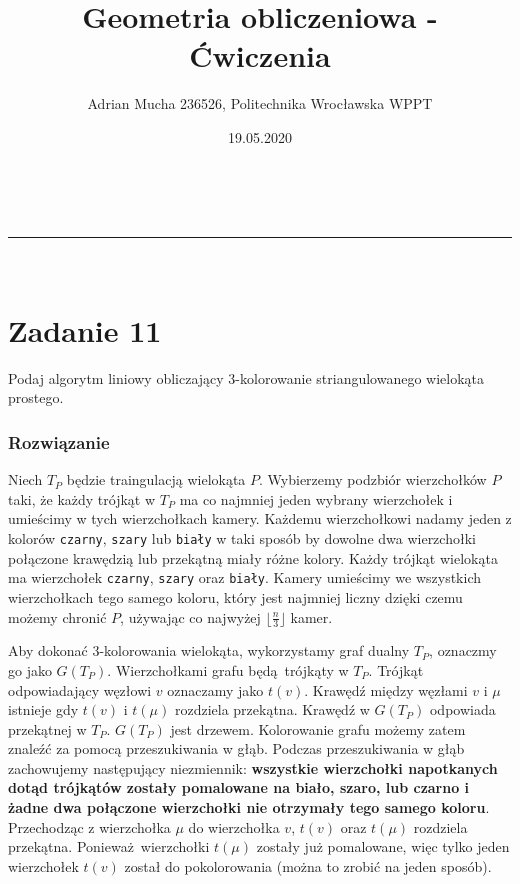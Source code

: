 \documentclass[a4paper,11pt]{article}
\makeatletter
\newcommand{\linia}{\rule{\linewidth}{0.5pt}}
\theoremstyle{mytheor}
\renewcommand{\maketitle}{
\begin{center}
\vspace{2ex}
{\huge \textsc{\@title}}
\vspace{1ex}
\\
\linia\\
\@author \hfill \@date
\vspace{4ex}
\end{center}
}
\makeatother
\begin{document}
\title{Geometria obliczeniowa - Ćwiczenia}

\author{Adrian Mucha 236526, Politechnika Wrocławska WPPT}

\date{19.05.2020}

\maketitle

\section*{Zadanie 11}
Podaj algorytm liniowy obliczający 3-kolorowanie striangulowanego wielokąta prostego.
\subsubsection*{Rozwiązanie}
Niech $T_P$ będzie traingulacją wielokąta $P$. Wybierzemy podzbiór wierzchołków $P$ taki, że każdy trójkąt w $T_P$ ma co najmniej jeden wybrany wierzchołek i umieścimy w tych wierzchołkach kamery. Każdemu wierzchołkowi nadamy jeden z kolorów \texttt{czarny}, \texttt{szary} lub \texttt{biały} w taki sposób by dowolne dwa wierzchołki połączone krawędzią lub przekątną miały różne kolory. Każdy trójkąt wielokąta ma wierzchołek \texttt{czarny}, \texttt{szary} oraz \texttt{biały}. Kamery umieścimy we wszystkich wierzchołkach tego samego koloru, który jest najmniej liczny dzięki czemu możemy chronić $P$, używając co najwyżej $\lfloor\frac{n}{3}\rfloor$ kamer.

Aby dokonać 3-kolorowania wielokąta, wykorzystamy graf dualny $T_P$, oznaczmy go jako $G(T_P)$. Wierzchołkami grafu będą trójkąty w $T_P$. Trójkąt odpowiadający węzłowi $v$ oznaczamy jako $t(v)$. Krawędź między węzłami $v$ i $\mu$ istnieje gdy $t(v)$ i $t(\mu)$ rozdziela przekątna. Krawędź w $G(T_P)$ odpowiada przekątnej w $T_P$. $G(T_P)$ jest drzewem. Kolorowanie grafu możemy zatem znaleźć za pomocą przeszukiwania w głąb. Podczas przeszukiwania w głąb zachowujemy następujący niezmiennik: \textbf{wszystkie wierzchołki napotkanych dotąd trójkątów zostały pomalowane na biało, szaro, lub czarno i żadne dwa połączone wierzchołki nie otrzymały tego samego koloru}. Przechodząc z wierzchołka $\mu$ do wierzchołka $v$, $t(v)$ oraz $t(\mu)$ rozdziela przekątna. Ponieważ wierzchołki $t(\mu)$ zostały już pomalowane, więc tylko jeden wierzchołek $t(v)$ został do pokolorowania (można to zrobić na jeden sposób). \\
\end{document}
